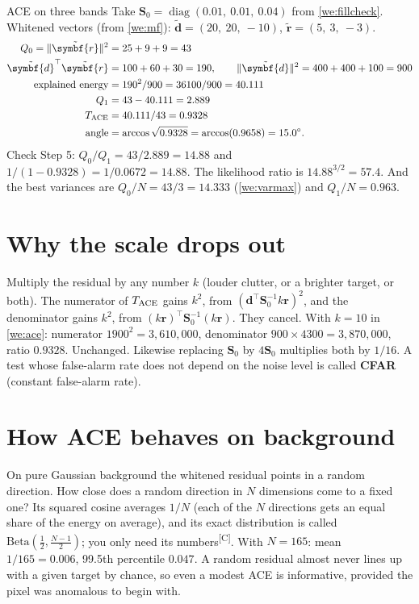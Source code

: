 \documentclass[11pt,a4paper,oneside,openany]{book}
\newcommand{\B}[1]{{\symbf{#1}}}
\newcommand{\B}[1]{{\bm{#1}}}
\newcommand{\comp}{\textsuperscript{\textsf{\scriptsize[C]}}}
\newcommand{\T}{^{\top}}
\newcommand{\nrm}[1]{\lVert #1\rVert}
\newcommand{\vr}{\B{r}}
\newcommand{\vd}{\B{d}}
\newcommand{\mS}{\B{S}}
\begin{document}
\begin{worked}[label=we:ace]{ACE on three bands}
Take $\mS_0=\operatorname{diag}(0.01,\ 0.01,\ 0.04)$ from \cref{we:fillcheck}. Whitened vectors (from \cref{we:mf}): $\tilde{\vd}=(20,\ 20,\ -10)$,
$\tilde{\vr}=(5,\ 3,\ -3)$.
\begin{align*}
Q_0=\nrm{\tilde{\vr}}^2 &= 25+9+9=43\\
\tilde{\vd}\T\tilde{\vr} &= 100+60+30=190,\qquad \nrm{\tilde{\vd}}^2=400+400+100=900\\
\text{explained energy} &= 190^2/900=36100/900=40.111\\
Q_1 &= 43-40.111=2.889\\
T_{\rm ACE} &= 40.111/43=0.9328\\
\text{angle} &= \arccos\sqrt{0.9328}=\arccos(0.9658)=15.0^\circ .
\end{align*}
Check Step 5: $Q_0/Q_1=43/2.889=14.88$ and $1/(1-0.9328)=1/0.0672=14.88$. The likelihood ratio is $14.88^{3/2}=57.4$. And the best variances are
$Q_0/N=43/3=14.333$ (\cref{we:varmax}) and $Q_1/N=0.963$.
\end{worked}

\section{Why the scale drops out}

Multiply the residual by any number $k$ (louder clutter, or a brighter target, or both). The numerator of $T_{\rm ACE}$ gains $k^2$, from
$(\vd\T\mS_0^{-1}k\vr)^2$, and the denominator gains $k^2$, from $(k\vr)\T\mS_0^{-1}(k\vr)$. They cancel. With $k=10$ in \cref{we:ace}: numerator
$1900^2=3{,}610{,}000$, denominator $900\times4300=3{,}870{,}000$, ratio $0.9328$. Unchanged. Likewise replacing $\mS_0$ by $4\mS_0$ multiplies both by
$1/16$. A test whose false-alarm rate does not depend on the noise level is called \textbf{CFAR} (constant false-alarm rate).

\section{How ACE behaves on background}

On pure Gaussian background the whitened residual points in a random direction. How close does a random direction in $N$ dimensions come to a
fixed one? Its squared cosine averages $1/N$ (each of the $N$ directions gets an equal share of the energy on average), and its exact distribution is
called $\mathrm{Beta}(\frac12,\frac{N-1}2)$; you only need its numbers\comp. With $N=165$: mean $1/165=0.006$, 99.5th percentile $0.047$. A random
residual almost never lines up with a given target by chance, so even a modest ACE is informative, provided the pixel was anomalous to begin
with.
\end{document}
